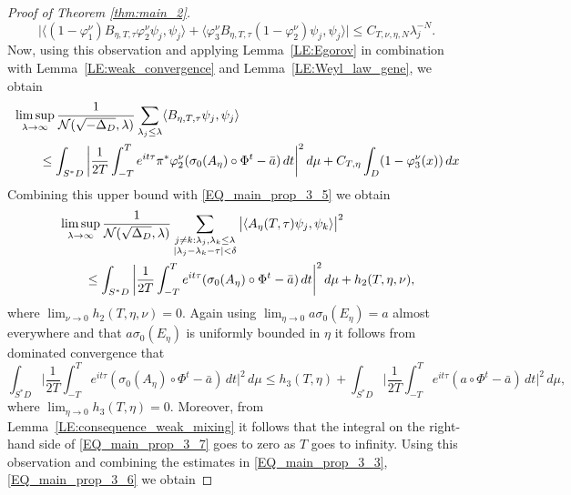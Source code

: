 \documentclass[10pt,a4paper]{amsart}
\newcommand{\1}{\mathrm{\mathbf{1}}}
\numberwithin{equation}{section}
\begin{document}
\begin{proof}[Proof of Theorem \ref{thm:main_2}]
\begin{equation}
    \big|\langle (1-\varphi_1^\nu) B_{\eta,T,\tau} \varphi_2^\nu \psi_j , \psi_j\rangle +\langle \varphi_3^\nu B_{\eta,T,\tau}(1- \varphi_2^\nu) \psi_j , \psi_j\rangle \big| \leq C_{T,\nu,\eta,N} \lambda_j^{-N}.
\end{equation}
Now, using this observation and applying Lemma~\ref{LE:Egorov} in combination with Lemma~\ref{LE:weak_convergence} and Lemma~\ref{LE:Weyl_law_gene}, we obtain
\begin{equation*}
    \begin{aligned}
     \MoveEqLeft 
     \limsup_{\lambda\rightarrow\infty}\frac{1 }{\mathcal{N}(\sqrt{-\Delta_D},\lambda)} \sum_{\lambda_j \leq \lambda} \langle B_{\eta,T,\tau} \psi_j , \psi_j\rangle
     \\
    &\leq \int_{S^*D} \bigg| \frac{1}{2T} \int_{-T}^{T} e^{it\tau} \pi^{*}\varphi^\nu_2 (\sigma_0(A_\eta)\circ\Phi^t - \bar{a}) \, dt \bigg|^2 \, d\mu + C_{T,\eta} \int_{D} (1-\varphi_3^\nu(x)) \, dx 
    \end{aligned}
\end{equation*}
Combining this upper bound with \eqref{EQ_main_prop_3_5} we obtain
\begin{equation}\label{EQ_main_prop_3_6}
    \begin{aligned}
        \MoveEqLeft \limsup_{\lambda\rightarrow\infty} \frac{1}{\mathcal{N}(\sqrt{\Delta_D},\lambda)} \sum_{\substack{j\neq k: \lambda_j,\lambda_k\leq \lambda  \\ |\lambda_{j}-\lambda_{k}-\tau| < \delta}} \big| \langle A_\eta(T,\tau) \psi_j , \psi_k\rangle  \big|^2 
        \\
        &\leq  
        \int_{S^*D} \bigg| \frac{1}{2T} \int_{-T}^{T}e^{it\tau} ( \sigma_0(A_\eta)\circ\Phi^t - \bar{a}) \, dt \bigg|^2 \, d\mu  + h_{2}(T,\eta,\nu),
        \end{aligned}
\end{equation}
where $\lim_{\nu\rightarrow 0} h_{2}(T,\eta,\nu)=0$. Again using $\lim_{\eta\rightarrow 0} a\sigma_0(E_\eta)=a$ almost everywhere and that $a\sigma_0(E_\eta)$ is uniformly bounded in $\eta$ it follows from dominated convergence that
\begin{equation}\label{EQ_main_prop_3_7}
        \int_{S^*D} \bigg| \frac{1}{2T} \int_{-T}^{T} e^{it\tau} (\sigma_0(A_\eta)\circ\Phi^t - \bar{a}) \, dt \bigg|^2 \, d\mu  \leq  h_3(T,\eta)+ \int_{S^*D} \bigg| \frac{1}{2T} \int_{-T}^{T} e^{it\tau}  ( a\circ\Phi^t - \bar{a}) \, dt \bigg|^2 \, d\mu,
\end{equation}
where $\lim_{\eta\rightarrow 0} h_3(T,\eta)=0$. Moreover, from Lemma~\ref{LE:consequence_weak_mixing} it follows that the integral on the right-hand side of \eqref{EQ_main_prop_3_7} goes to zero as $T$ goes to infinity. Using this observation and combining the estimates in \eqref{EQ_main_prop_3_3}, \eqref{EQ_main_prop_3_6} we obtain 

\end{proof}
\end{document}
